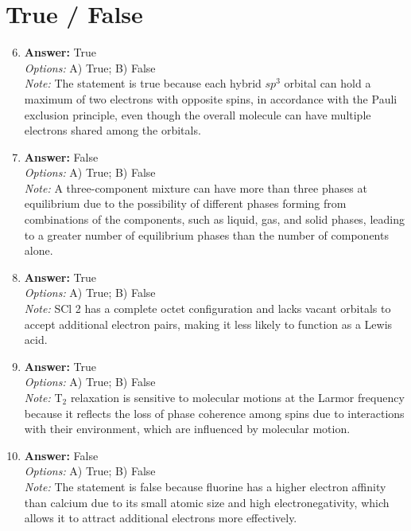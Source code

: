 \documentclass[12pt]{article}
\begin{document}
\section*{True / False}
\begin{enumerate}[label=\arabic*.]
\setcounter{enumi}{5}
\item \textbf{Answer:} True
\\ \textit{Options:} A) True; B) False
\\ \textit{Note:} The statement is true because each hybrid $sp^3$ orbital can hold a maximum of two electrons with opposite spins, in accordance with the Pauli exclusion principle, even though the overall molecule can have multiple electrons shared among the orbitals.
\item \textbf{Answer:} False
\\ \textit{Options:} A) True; B) False
\\ \textit{Note:} A three-component mixture can have more than three phases at equilibrium due to the possibility of different phases forming from combinations of the components, such as liquid, gas, and solid phases, leading to a greater number of equilibrium phases than the number of components alone.
\item \textbf{Answer:} True
\\ \textit{Options:} A) True; B) False
\\ \textit{Note:} SCl 2 has a complete octet configuration and lacks vacant orbitals to accept additional electron pairs, making it less likely to function as a Lewis acid.
\item \textbf{Answer:} True
\\ \textit{Options:} A) True; B) False
\\ \textit{Note:} T$_{2}$ relaxation is sensitive to molecular motions at the Larmor frequency because it reflects the loss of phase coherence among spins due to interactions with their environment, which are influenced by molecular motion.
\item \textbf{Answer:} False
\\ \textit{Options:} A) True; B) False
\\ \textit{Note:} The statement is false because fluorine has a higher electron affinity than calcium due to its small atomic size and high electronegativity, which allows it to attract additional electrons more effectively.
\end{enumerate}
\end{document}
